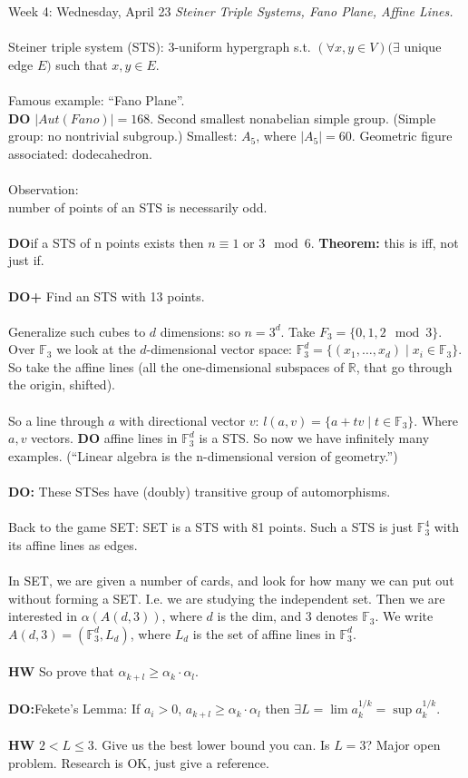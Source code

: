 \documentclass[12pt]{article}
\theoremstyle{remark}
\newcommand{\R}{\mathbb{R}}
\newcommand{\F}{\mathbb{F}}
\begin{document}
\label{11}\begin{section}{Week 4: Wednesday, April 23}
\indent\textit{Steiner Triple Systems, Fano Plane, Affine Lines.}\\\\
Steiner triple system (STS): 3-uniform hypergraph s.t. $(\forall x,y \in V)(\exists$ unique edge $E)$ such that $x,y \in E$.
\\\\Famous example: ``Fano Plane''.
\\\textbf{DO} $|Aut(Fano)| = 168$. Second smallest nonabelian simple group. (Simple group: no nontrivial subgroup.) Smallest: $A_5$, where $|A_5| = 60$. Geometric figure associated: dodecahedron.
\\\\
Observation:
\\number of points of an STS is necessarily odd.
\\\\\textbf{DO}if a STS of n points exists then $n \equiv 1$ or $3 \mod 6$. \textbf{Theorem:} this is iff, not just if.
\\\\\textbf{DO+} Find an STS with 13 points. 
\\\\Generalize such cubes to $d$ dimensions: so $n = 3^d$. Take $F_3 = \{0,1,2 \mod 3\}$. Over $\F_3$ we look at the $d$-dimensional vector space: $\F_3^d =\{(x_1,\ldots,x_d) \mid x_i \in \F_3\}$. So take the affine lines (all the one-dimensional subspaces of $\R$, that go through the origin, shifted).
\\\\So a line through $a$ with directional vector $v$: $l(a,v) = \{a+tv \mid t \in \F_3\}$. Where $a,v$ vectors. \textbf{DO} affine lines in $\F_3^d$ is a STS. So now we have infinitely many examples. (``Linear algebra is the n-dimensional version of geometry.'')
\\\\
\textbf{DO:} These STSes have (doubly) transitive group of automorphisms.
\\\\
Back to the game SET: SET is a STS with 81 points. Such a STS is just $\F_3^4$ with its affine lines as edges.
\\\\In SET, we are given a number of cards, and look for how many we can put out without forming a SET. I.e. we are studying the independent set. Then we are interested in $\alpha(A(d,3))$, where $d$ is the dim, and $3$ denotes $\F_3$. We write $A(d,3) = (\F_3^d,L_d)$, where $L_d$ is the set of affine lines in $\F_3^d$.
\\\\
\textbf{HW} So prove that $\alpha_{k + l} \geq \alpha_k \cdot \alpha_l$.
\\\\\textbf{DO:}Fekete's Lemma: If $a_i > 0$, $a_{k+l} \geq \alpha_k \cdot \alpha_l$ then $\exists L = \lim a_k^{1/k} = \sup a_k^{1/k}$.
\\\\\textbf{HW} $2 < L \leq 3$. Give us the best lower bound you can. Is $L=3$? Major open problem. Research is OK, just give a reference.
\end{section}
\end{document}
